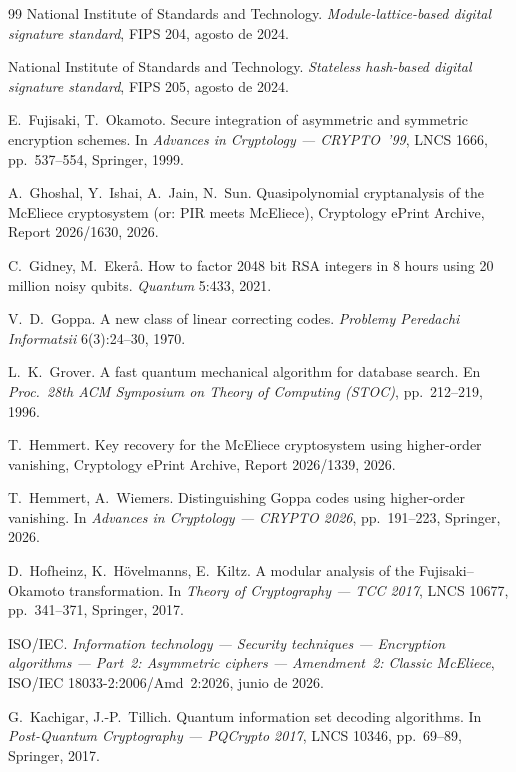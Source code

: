 \documentclass[11pt,a4paper,oneside]{report}
\begin{document}
\begin{thebibliography}{99}
National Institute of Standards and Technology. \emph{Module-lattice-based
digital signature standard}, FIPS 204, agosto de 2024.

National Institute of Standards and Technology. \emph{Stateless
hash-based digital signature standard}, FIPS 205, agosto de 2024.

E.~Fujisaki, T.~Okamoto. Secure integration of asymmetric and
symmetric encryption schemes. In \emph{Advances in Cryptology ---
CRYPTO~'99}, LNCS 1666, pp.~537--554, Springer, 1999.

A.~Ghoshal, Y.~Ishai, A.~Jain, N.~Sun. Quasipolynomial cryptanalysis
of the McEliece cryptosystem (or: PIR meets McEliece), Cryptology
ePrint Archive, Report 2026/1630, 2026.

C.~Gidney, M.~Eker\r{a}. How to factor 2048 bit RSA integers in
8 hours using 20 million noisy qubits. \emph{Quantum} 5:433, 2021.

V.~D.~Goppa. A new class of linear correcting codes.
\emph{Problemy Peredachi Informatsii} 6(3):24--30, 1970.

L.~K.~Grover. A fast quantum mechanical algorithm for database
search. En \emph{Proc.\ 28th ACM Symposium on Theory of Computing
(STOC)}, pp.~212--219, 1996.

T.~Hemmert. Key recovery for the McEliece cryptosystem using
higher-order vanishing, Cryptology ePrint Archive, Report 2026/1339,
2026.

T.~Hemmert, A.~Wiemers. Distinguishing Goppa codes using
higher-order vanishing. In \emph{Advances in Cryptology ---
CRYPTO 2026}, pp.~191--223, Springer, 2026.

D.~Hofheinz, K.~H\"ovelmanns, E.~Kiltz. A modular analysis of the
Fujisaki--Okamoto transformation. In \emph{Theory of Cryptography ---
TCC 2017}, LNCS 10677, pp.~341--371, Springer, 2017.

ISO/IEC. \emph{Information technology --- Security techniques ---
Encryption algorithms --- Part~2: Asymmetric ciphers ---
Amendment~2: Classic McEliece}, ISO/IEC 18033-2:2006/Amd~2:2026,
junio de 2026.

G.~Kachigar, J.-P.~Tillich. Quantum information set decoding
algorithms. In \emph{Post-Quantum Cryptography --- PQCrypto 2017},
LNCS 10346, pp.~69--89, Springer, 2017.


\end{thebibliography}
\end{document}

